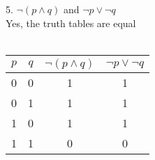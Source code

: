 \documentclass[11pt]{article}
\begin{document}
5. $\neg (p \land q)$ and $\neg p \lor \neg q$ \\
Yes, the truth tables are equal \\\\
\begin{tabular}{|c|c|c|c|}
\hline
$p$ & $q$ & $ \lnot (p \land q)$ & $ \lnot p \lor  \lnot q$ \\
\hline
0 & 0 & 1 & 1 \\
0 & 1 & 1 & 1 \\
1 & 0 & 1 & 1 \\
1 & 1 & 0 & 0 \\
\hline
\end{tabular}
\end{document}
